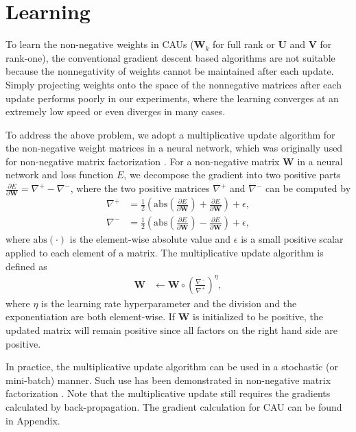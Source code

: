 \documentclass[conference]{IEEEtran}
\begin{document}
\section{Learning} \label{sec:learning}
To learn the non-negative weights in CAUs ($\mathbf{W}_k$ for full rank or $\mathbf{U}$ and $\mathbf{V}$ for rank-one), 
the conventional gradient descent based algorithms are not suitable because the nonnegativity of weights cannot be maintained after each update. Simply projecting weights onto the space of the nonnegative matrices after each update performs poorly in our experiments, where the learning converges at an extremely low speed or even diverges in many cases.

To address the above problem, we adopt a multiplicative update algorithm for the non-negative weight matrices in a neural network, which was originally used for non-negative matrix factorization \cite{lee2001algorithms}. 
For a non-negative matrix $\mathbf{W}$ in a neural network and loss function $E$, we decompose the gradient into two positive parts $\frac{\partial E}{\partial \mathbf{W}} = \nabla^+ - \nabla^-$,
where the two positive matrices $\nabla^+$ and $\nabla^-$ can be computed by 
\begin{align}
\nabla^+ &= \frac{1}{2}\left(\text{abs}\left(\frac{\partial E}{\partial \mathbf{W}}\right) + \frac{\partial E}{\partial \mathbf{W}}\right) + \epsilon, \\
\nabla^- &= \frac{1}{2}\left(\text{abs}\left(\frac{\partial E}{\partial \mathbf{W}}\right) - \frac{\partial E}{\partial \mathbf{W}}\right) + \epsilon,
\end{align}
where $\text{abs}(\cdot)$ is the element-wise absolute value and $\epsilon$ is a small positive scalar applied to each element of a matrix.
The multiplicative update algorithm is defined as 
\begin{align} 
\mathbf{W} &\leftarrow \mathbf{W}
 \circ 
\left(\frac{\nabla^- }{\nabla^+ }\right)^\eta,
\label{mul_update}
\end{align}
where $\eta$ is the learning rate hyperparameter and the division and the exponentiation are both element-wise. If $\mathbf{W}$ is initialized to be positive, the updated matrix will remain positive since all factors on the right hand side are positive. 

In practice, the multiplicative update algorithm can be used in a stochastic (or mini-batch) manner. Such use has been demonstrated in non-negative matrix factorization \cite{serizel2016mini}. Note that the multiplicative update still requires the gradients calculated by back-propagation. The gradient calculation for CAU can be found in Appendix.
\end{document}
